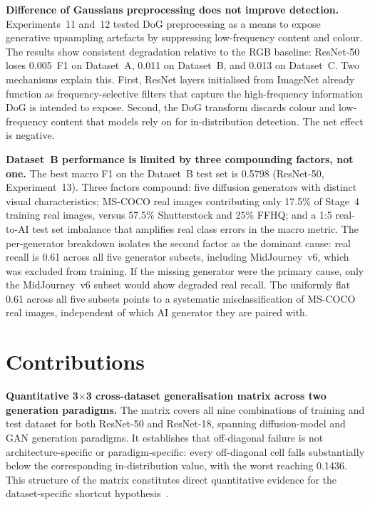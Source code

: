 \textbf{Difference of Gaussians preprocessing does not improve detection.}
Experiments~11 and~12 tested DoG preprocessing as a means to expose generative upsampling
artefacts by suppressing low-frequency content and colour. The results show consistent
degradation relative to the RGB baseline: ResNet-50 loses 0.005~F1 on Dataset~A, 0.011
on Dataset~B, and 0.013 on Dataset~C. Two mechanisms explain this. First, ResNet layers
initialised from ImageNet already function as frequency-selective filters that capture the
high-frequency information DoG is intended to expose. Second, the DoG transform discards
colour and low-frequency content that models rely on for in-distribution detection. The
net effect is negative.

\textbf{Dataset~B performance is limited by three compounding factors, not one.}
The best macro F1 on the Dataset~B test set is 0.5798 (ResNet-50, Experiment~13). Three
factors compound: five diffusion generators with distinct visual characteristics; MS-COCO
real images contributing only 17.5\% of Stage~4 training real images, versus 57.5\%
Shutterstock and 25\% FFHQ; and a 1:5 real-to-AI test set imbalance that amplifies real
class errors in the macro metric. The per-generator breakdown isolates the second factor
as the dominant cause: real recall is 0.61 across all five generator subsets, including
MidJourney~v6, which was excluded from training. If the missing generator were the primary
cause, only the MidJourney~v6 subset would show degraded real recall. The uniformly flat
0.61 across all five subsets points to a systematic misclassification of MS-COCO real
images, independent of which AI generator they are paired with.


\section{Contributions}
\label{sec:contributions}

\textbf{Quantitative 3$\times$3 cross-dataset generalisation matrix across two generation
paradigms.} The matrix covers all nine combinations of training and test dataset for both
ResNet-50 and ResNet-18, spanning diffusion-model and GAN generation paradigms. It
establishes that off-diagonal failure is not architecture-specific or paradigm-specific:
every off-diagonal cell falls substantially below the corresponding in-distribution value,
with the worst reaching 0.1436. This structure of the matrix constitutes direct
quantitative evidence for the dataset-specific shortcut hypothesis~\cite{geirhos2020shortcut}.

